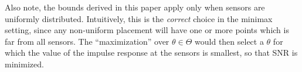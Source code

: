 \documentclass[conference,letterpaper]{IEEEtran}
\DeclarePairedDelimiter\abs{\lvert}{\rvert}
\begin{document}
Also note, the bounds derived in this paper apply only when sensors are
uniformly distributed.  Intuitively, this is the \emph{correct} choice in the
minimax setting, since any non-uniform placement will have one or more points
which is far from all sensors. The ``maximization'' over $\theta \in \Theta$
would then select a $\theta$ for which the value of the impulse response at the
sensors is smallest, so that SNR is minimized.





\end{document}
